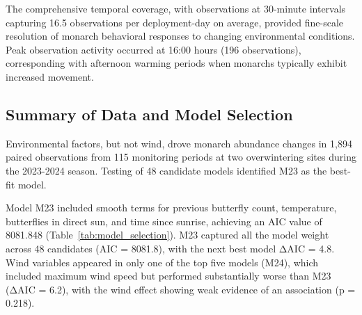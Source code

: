The comprehensive temporal coverage, with observations at 30-minute intervals capturing 16.5 observations per deployment-day on average, provided fine-scale resolution of monarch behavioral responses to changing environmental conditions. Peak observation activity occurred at 16:00 hours (196 observations), corresponding with afternoon warming periods when monarchs typically exhibit increased movement.

\subsection{Summary of Data and Model Selection}

Environmental factors, but not wind, drove monarch abundance changes in 1,894 paired observations from 115 monitoring periods at two overwintering sites during the 2023-2024 season. Testing of 48 candidate models identified M23 as the best-fit model.

Model M23 included smooth terms for previous butterfly count, temperature, butterflies in direct sun, and time since sunrise, achieving an AIC value of 8081.848 (Table~\ref{tab:model_selection}). M23 captured all the model weight across 48 candidates (AIC = 8081.8), with the next best model ΔAIC = 4.8. Wind variables appeared in only one of the top five models (M24), which included maximum wind speed but performed substantially worse than M23 (ΔAIC = 6.2), with the wind effect showing weak evidence of an association (p = 0.218).

